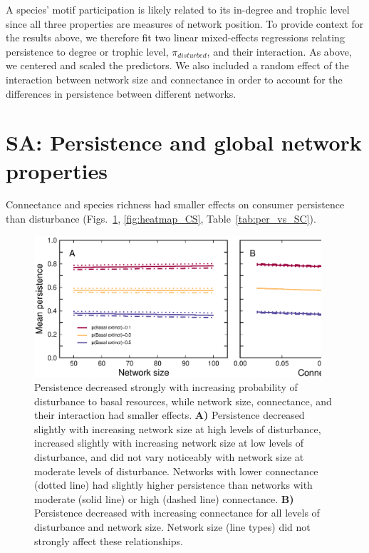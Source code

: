 \documentclass[12pt]{article}
\begin{document}
\begin{spacing}{2.0}
            A species’ motif participation is likely related to its in-degree and trophic level since all three properties are measures of network position. To provide context for the results above, we therefore fit two linear mixed-effects regressions relating persistence to degree or trophic level, $\pi_{disturbed}$, and their interaction. As above, we centered and scaled the predictors. We also included a random effect of the interaction between network size and connectance in order to account for the differences in persistence between different networks.
                

\section{SA: Persistence and global network properties}

    Connectance and species richness had smaller effects on consumer persistence than disturbance (Figs.~\ref{fig:lm_CS}, \ref{fig:heatmap_CS}, Table~\ref{tab:per_vs_SC}).


    \begin{figure}[h!]
        \centering
        \includegraphics[width=0.95\textwidth]{figures/persistence_vs_SC_lm.eps}
        \caption{Persistence decreased strongly with increasing probability of disturbance to basal resources, while network size, connectance, and their interaction had smaller effects. \textbf{A)} Persistence decreased slightly with increasing network size at high levels of disturbance, increased slightly with increasing network size at low levels of disturbance, and did not vary noticeably with network size at moderate levels of disturbance. Networks with lower connectance (dotted line) had slightly higher persistence than networks with moderate (solid line) or high (dashed line) connectance.
        \textbf{B)} Persistence decreased with increasing connectance for all levels of disturbance and network size. Network size (line types) did not strongly affect these relationships.}
        \label{fig:lm_CS}
    \end{figure}




\end{spacing}
\end{document}
